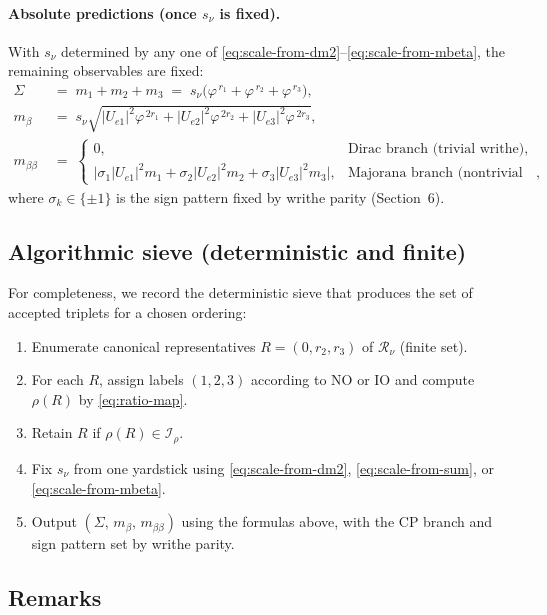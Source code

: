 \documentclass[11pt]{article}
\begin{document}
\paragraph{Absolute predictions (once $s_\nu$ is fixed).}
With $s_\nu$ determined by any one of \eqref{eq:scale-from-dm2}--\eqref{eq:scale-from-mbeta}, the remaining observables are fixed:
\begin{align*}
\Sigma \;&=\; m_1+m_2+m_3 \;=\; s_\nu\bigl(\varphi^{\,r_1}+\varphi^{\,r_2}+\varphi^{\,r_3}\bigr),\\[0.25em]
m_\beta \;&=\; s_\nu\sqrt{|U_{e1}|^2\varphi^{\,2r_1}+|U_{e2}|^2\varphi^{\,2r_2}+|U_{e3}|^2\varphi^{\,2r_3}},\\[0.25em]
m_{\beta\beta} \;&=\; 
\begin{cases}
0, & \text{Dirac branch (trivial writhe)},\\[0.25em]
\bigl|\sigma_1|U_{e1}|^2 m_1+\sigma_2|U_{e2}|^2 m_2+\sigma_3|U_{e3}|^2 m_3\bigr|, & \text{Majorana branch (nontrivial writhe)},
\end{cases}
\end{align*}
where $\sigma_k\in\{\pm 1\}$ is the sign pattern fixed by writhe parity (Section~6).

\subsection*{Algorithmic sieve (deterministic and finite)}

For completeness, we record the deterministic sieve that produces the set of accepted triplets for a chosen ordering:
\begin{enumerate}
  \item Enumerate canonical representatives $R=(0,r_2,r_3)$ of $\mathcal{R}_\nu$ (finite set).
  \item For each $R$, assign labels $(1,2,3)$ according to NO or IO and compute $\rho(R)$ by \eqref{eq:ratio-map}.
  \item Retain $R$ if $\rho(R)\in\mathcal{I}_\rho$.
  \item Fix $s_\nu$ from one yardstick using \eqref{eq:scale-from-dm2}, \eqref{eq:scale-from-sum}, or \eqref{eq:scale-from-mbeta}.
  \item Output $(\Sigma,\,m_\beta,\,m_{\beta\beta})$ using the formulas above, with the CP branch and sign pattern set by writhe parity.
\end{enumerate}

\subsection*{Remarks}
\end{document}
